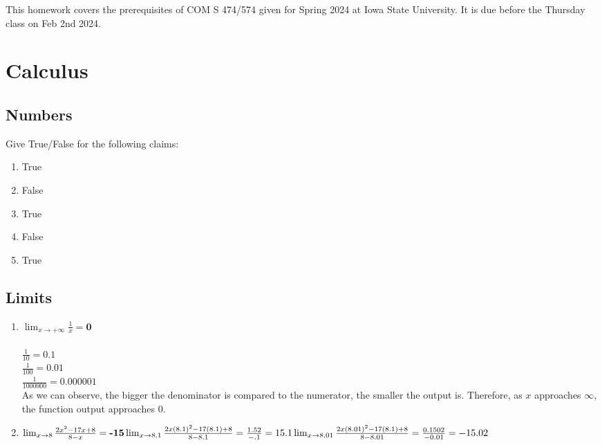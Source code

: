 \documentclass{assignment}
\date{}
\begin{document}
\begin{problem}
This homework covers the prerequisites of COM S 474/574 given for Spring 2024 at Iowa State University. It is due before the Thursday class on Feb 2nd 2024.

\section{Calculus}

\subsection{Numbers}
Give True/False for the following claims:
\begin{enumerate}
    \item True 
    \item False
    \item True
    \item False
    \item True
\end{enumerate}

\subsection{Limits}
\begin{enumerate}
    \item $\lim_{x\rightarrow +\infty} \frac{1}{x} = \textbf{0}$\\\\
    $\frac{1}{10} = 0.1$ \\
    $\frac{1}{100} = 0.01$ \\ 
    $\frac{1}{1000000} = 0.000001$\\

As we can observe, the bigger the denominator is compared to the numerator, the smaller the output is. Therefore, as $x$ approaches $\infty$, the function output approaches 0.\\
    \item $\lim_{x\rightarrow8} \frac{2x^2-17x+8}{8-x} = \textbf{-15}\\\\
    \lim_{x\rightarrow8.1} \frac{2x(8.1)^2 - 17(8.1)+8}{8-8.1} = \frac{1.52}{-.1} = \-15.1\\\\
    \lim_{x\rightarrow8.01} \frac{2x(8.01)^2 - 17(8.1)+8}{8-8.01} = \frac{0.1502}{-0.01} = -15.02$\\


\end{enumerate}
\end{problem}
\end{document}

